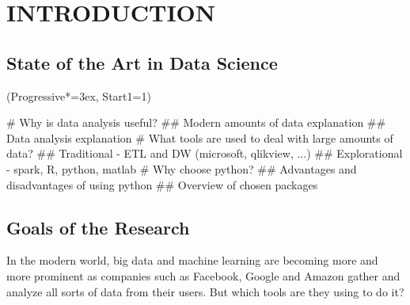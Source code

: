 \documentclass[12pt, a4paper]{article}
\let\OldEasylist\easylist
\let\OldEndEasylist\endeasylist
\renewenvironment{easylist}{%
    \OldEasylist%
    \ListProperties(Progressive*=3ex, Start1=1)%
}{%
    \OldEndEasylist%
}%
\begin{document}

\begin{titlepage}
\end{titlepage}

\newpage


\tableofcontents

\newpage
\newpage
{}


\begin{abstract}

\end{abstract}



\newpage
\section{INTRODUCTION}

\subsection{State of the Art in Data Science}
\begin{easylist}
# Why is data analysis useful?
## Modern amounts of data explanation
## Data analysis explanation
# What tools are used to deal with large amounts of data?
## Traditional - ETL and DW (microsoft, qlikview, ...)
## Explorational - spark, R, python, matlab
# Why choose python?
## Advantages and disadvantages of using python
## Overview of chosen packages
\end{easylist}

\subsection{Goals of the Research}
In the modern world, big data and machine learning are becoming more and more prominent as companies such as Facebook, Google and Amazon gather and analyze all sorts of data from their users. But which tools are they using to do it?
\end{document}
